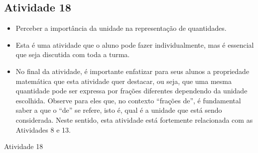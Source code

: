 \begin{multicols}{2}
\subsection{Atividade 18}



  \vspace{.1cm}

\begin{itemize} %
    \item       Perceber a importância da unidade na representação de quantidades.
\end{itemize} %



  \vspace{.1cm}

  \vspace{.1cm}

\begin{itemize} %
    \item       Esta é uma atividade que o aluno pode fazer individualmente, mas é essencial que seja discutida com toda a turma.
    \item       No final da atividade, é importante enfatizar para seus alunos a propriedade matemática que esta atividade quer destacar, ou seja, que uma mesma quantidade pode ser expressa por frações diferentes dependendo da unidade escolhida. Observe para eles que, no contexto       ``frações de'', é fundamental saber a que o       ``de''     se refere, isto é, qual é a unidade que está sendo considerada. Neste sentido, esta atividade está fortemente relacionada com as Atividades 8 e 13.
\end{itemize} %


  \vspace{.1cm}



\begin{resposta*}{Atividade 18}


\end{resposta*}
\end{multicols}
